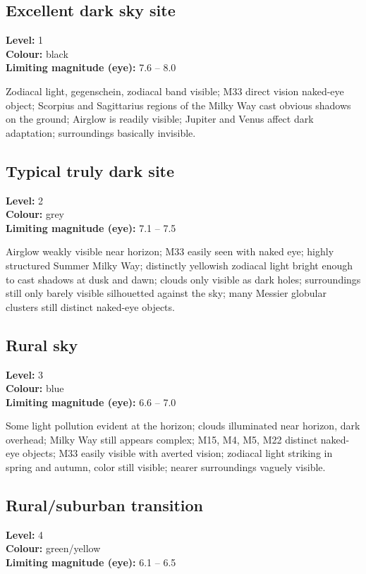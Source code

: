 \subsection{Excellent dark sky site}
\textbf{Level:} 1 \\
\textbf{Colour:} black \\
\textbf{Limiting magnitude (eye):} 7.6 -- 8.0

Zodiacal light, gegenschein, zodiacal band visible; M33 direct vision naked-eye object; Scorpius and Sagittarius regions of the Milky Way cast obvious shadows on the ground; Airglow is readily visible; Jupiter and Venus affect dark adaptation; surroundings basically invisible.

\subsection{Typical truly dark site}
\textbf{Level:} 2 \\
\textbf{Colour:} grey \\
\textbf{Limiting magnitude (eye):} 7.1 -- 7.5

Airglow weakly visible near horizon; M33 easily seen with naked eye; highly structured Summer Milky Way; distinctly yellowish zodiacal light bright enough to cast shadows at dusk and dawn; clouds only visible as dark holes; surroundings still only barely visible silhouetted against the sky; many Messier globular clusters still distinct naked-eye objects.

\subsection{Rural sky}
\textbf{Level:} 3 \\
\textbf{Colour:} blue \\
\textbf{Limiting magnitude (eye):} 6.6 -- 7.0

Some light pollution evident at the horizon; clouds illuminated near horizon, dark overhead; Milky Way still appears complex; M15, M4, M5, M22 distinct naked-eye objects; M33 easily visible with averted vision; zodiacal light striking in spring and
autumn, color still visible; nearer surroundings vaguely visible.

\subsection{Rural/suburban transition}
\textbf{Level:} 4 \\
\textbf{Colour:} green/yellow \\
\textbf{Limiting magnitude (eye):} 6.1 -- 6.5

